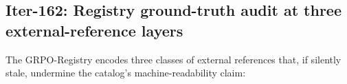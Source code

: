 %
%
%

\subsection{Iter-162: Registry ground-truth audit at three external-reference layers}
\label{sec:p6_iter162_groundtruth_audit}

The GRPO-Registry encodes three classes of external references that, if
silently stale, undermine the catalog's machine-readability claim:

